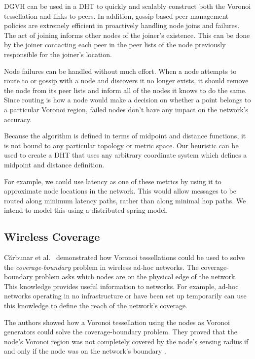 DGVH can be used in a DHT to quickly and scalably construct both the Voronoi tessellation and links to peers.
In addition, gossip-based peer management policies are extremely efficient in proactively handling node joins and failures.
The act of joining informs other nodes of the joiner's existence.
This can be done by the joiner contacting each peer in the peer lists of the node previously responsible for the joiner's location.

Node failures can be handled without much effort.
When a node attempts to route to or gossip with a node and discovers it no longer exists, it should remove the node from its peer lists and inform all of the nodes it knows to do the same.
Since routing is how a node would make a decision on whether a point belongs to a particular Voronoi region, failed nodes don't have any impact on the network's accuracy.


Because the algorithm is defined in terms of midpoint and distance functions, it is not bound to any particular topology or metric space.
Our heuristic can be used to create a DHT that uses any arbitrary coordinate system which defines a midpoint and distance definition.

For example, we could use latency as one of these metrics by using it to approximate node locations in the network.
This would allow messages to be routed along minimum latency paths, rather than along minimal hop paths.
We intend to model this using a distributed spring model.


\subsection{Wireless Coverage}
C\u{a}rbunar et al.\ \cite{carbunar2004distributed} demonstrated how Voronoi tessellations could be used to solve the \textit{coverage-boundary} problem in wireless ad-hoc networks.
The coverage-boundary problem asks which nodes are on the physical edge of the network.
This knowledge provides useful information to networks.
For example, ad-hoc networks operating in no infrastructure or have been set up temporarily can use this knowledge to define the reach of the network's coverage.

The authors showed how a Voronoi tessellation using the nodes as Voronoi generators could solve the coverage-boundary problem.
They proved that the node's Voronoi region was not completely covered by the node's sensing radius if and only if the node was on the network's boundary \cite{carbunar2004distributed}.

